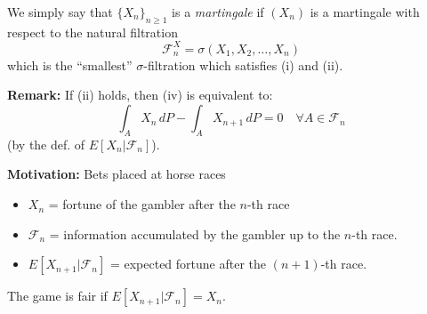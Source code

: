 We simply say that $\{X_n\}_{n\geq1}$ is a \emph{martingale} if $(X_n)$ is a martingale with respect to the natural filtration 
\[
\mathcal{F}_n^X = \sigma(X_1, X_2, \ldots, X_n)
\]
which is the ``smallest'' $\sigma$-filtration which satisfies (i) and (ii).

\textbf{Remark:} 
If (ii) holds, then (iv) is equivalent to:
\[
\int_A X_n \, dP - \int_A X_{n+1} \, dP = 0 \quad \forall A \in \mathcal{F}_n
\]
(by the def. of $E[X_n|\mathcal{F}_n]$).

\textbf{Motivation:} Bets placed at horse races
\begin{itemize}
    \item $X_n$ = fortune of the gambler after the $n$-th race
    \item $\mathcal{F}_n$ = information accumulated by the gambler up to the $n$-th race.
    \item $E[X_{n+1} | \mathcal{F}_n]$ = expected fortune after the $(n+1)$-th race.
\end{itemize}
The game is fair if $E[X_{n+1} | \mathcal{F}_n] = X_n$.